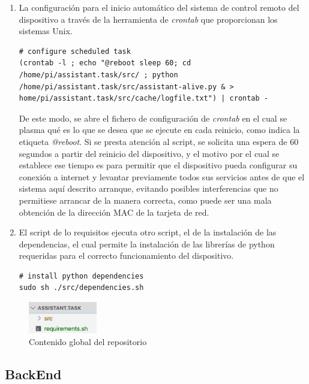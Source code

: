 \begin{enumerate}
    \item La configuración para el inicio automático del sistema de control remoto del dispositivo a través de la herramienta de \textit{crontab} que proporcionan los sistemas Unix.
    
\begin{lstlisting}
# configure scheduled task
(crontab -l ; echo "@reboot sleep 60; cd /home/pi/assistant.task/src/ ; python /home/pi/assistant.task/src/assistant-alive.py & > home/pi/assistant.task/src/cache/logfile.txt") | crontab -
\end{lstlisting}

De este modo, se abre el fichero de configuración de \textit{crontab} en el cual se plasma qué es lo que se desea que se ejecute en cada reinicio, como indica la etiqueta \textit{@reboot}.
Si se presta atención al script, se solicita una espera de 60 segundos a partir del reinicio del dispositivo, y el motivo por el cual se establece ese tiempo es para permitir que el dispositivo pueda configurar su conexión a internet y levantar previamente todos sus servicios antes de que el sistema aquí descrito arranque, evitando posibles interferencias que no permitiese arrancar de la manera correcta, como puede ser una mala obtención de la dirección MAC de la tarjeta de red.

\item El script de lo requisitos ejecuta otro script, el de la instalación de las dependencias, el cual permite la instalación de las librerías de python requeridas para el correcto funcionamiento del dispositivo.

\begin{lstlisting}
# install python dependencies
sudo sh ./src/dependencies.sh
\end{lstlisting}

\end{enumerate}


\begin{figure}[h!]
    \centering
    \includegraphics[width=3cm]{./img/arch/device/src.web.global.png}
    \caption{Contenido global del repositorio}
    \label{fig:src.web.global}
\end{figure}

\subsection{BackEnd}


